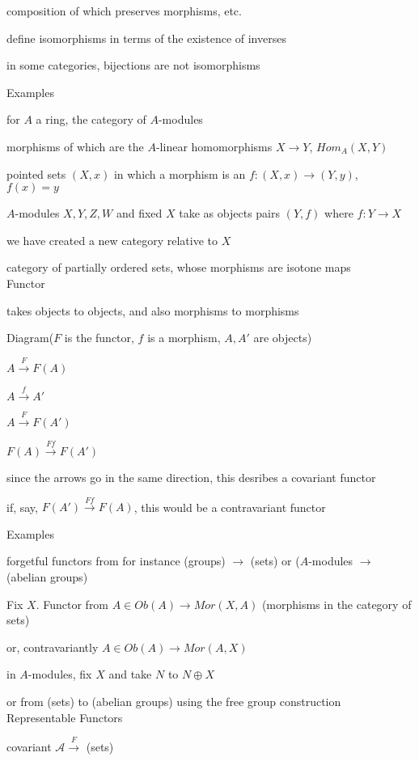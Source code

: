 \documentclass[12pt]{article}
\begin{document}
composition of which preserves morphisms, etc.

define isomorphisms in terms of the existence of inverses

in some categories, bijections are not isomorphisms

\noindent
Examples

for $A$ a ring, the category of $A$-modules

morphisms of which are the $A$-linear homomorphisms $X \to Y$, $Hom_A(X, Y)$

pointed sets $(X, x)$ in which a morphism is an $f:(X, x) \to (Y, y)$, $f(x) = y$

$A$-modules $X, Y, Z, W$ and fixed $X$ take as objects pairs $(Y, f)$ where $f: Y \to X$

we have created a new category relative to $X$

category of partially ordered sets, whose morphisms are isotone maps\\

\noindent
Functor

takes objects to objects, and also morphisms to morphisms

\noindent
Diagram($F$ is the functor, $f$ is a morphism, $A, A'$ are objects)

$A \xrightarrow{F} F(A)$

$A \xrightarrow{f} A'$

$A \xrightarrow{F} F(A')$

$F(A) \xrightarrow{Ff} F(A')$

since the arrows go in the same direction, this desribes a covariant functor

if, say, $F(A') \xrightarrow{Ff} F(A)$, this would be a contravariant functor

\noindent
Examples

forgetful functors from for instance (groups) $\to$ (sets) or ($A$-modules $\to$ (abelian groups)

Fix $X$. Functor from $A \in Ob(A) \to Mor(X, A)$ (morphisms in the category of sets)

or, contravariantly $A \in Ob(A) \to Mor(A, X)$

in $A$-modules, fix $X$ and take $N$ to $N \oplus X$

or from (sets) to (abelian groups) using the free group construction\\

\noindent
Representable Functors

covariant $\mathcal{A} \xrightarrow{F}$ (sets)
\end{document}
